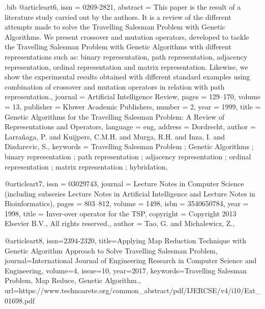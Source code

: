 \begin{filecontents}{\jobname.bib}
	@article{art6,
		issn = {0269-2821},
		abstract = {This paper is the result of a literature study carried out by the authors. It is a review of the different attempts made to solve the Travelling Salesman Problem with Genetic Algorithms. We present crossover and mutation operators, developed to tackle the Travelling Salesman Problem with Genetic Algorithms with different representations such as: binary representation, path representation, adjacency representation, ordinal representation and matrix representation. Likewise, we show the experimental results obtained with different standard examples using combination of crossover and mutation operators in relation with path representation.},
		journal = {Artificial Intelligence Review},
		pages = {129--170},
		volume = {13},
		publisher = {Kluwer Academic Publishers},
		number = {2},
		year = {1999},
		title = {Genetic Algorithms for the Travelling Salesman Problem: A Review of Representations and Operators},
		language = {eng},
		address = {Dordrecht},
		author = {Larra\~naga, P. and Kuijpers, C.M.H. and Murga, R.H. and Inza, I. and Dizdarevic, S.},
		keywords = {Travelling Salesman Problem ; Genetic Algorithms ; binary representation ; path representation ; adjacency representation ; ordinal representation ; matrix representation ; hybridation},
	}
	
	@article{art7,
		issn = {03029743},
		journal = {Lecture Notes in Computer Science (including subseries Lecture Notes in Artificial Intelligence and Lecture Notes in Bioinformatics)},
		pages = {803--812},
		volume = {1498},
		isbn = {3540650784},
		year = {1998},
		title = {Inver-over operator for the TSP},
		copyright = {Copyright 2013 Elsevier B.V., All rights reserved.},
		author = {Tao, G. and Michalewicz, Z.},
	}
	
	@article{art8,
		issn={2394-2320},
		title={Applying Map Reduction Technique with Genetic
			Algorithm Approach to Solve Travelling Salesman
			Problem}, 
		journal={International Journal of Engineering Research in Computer Science and Engineering},
		volume={4},
		issue={10},
		year={2017},
		keywords={Travelling Salesman Problem, Map Reduce, Genetic Algorithm.},
		url={https://www.technoarete.org/common_abstract/pdf/IJERCSE/v4/i10/Ext_01698.pdf}
	}
\end{filecontents}


\documentclass{article}

\usepackage{3201proj}
\usepackage[utf8]{inputenc}

\usepackage{biblatex}



